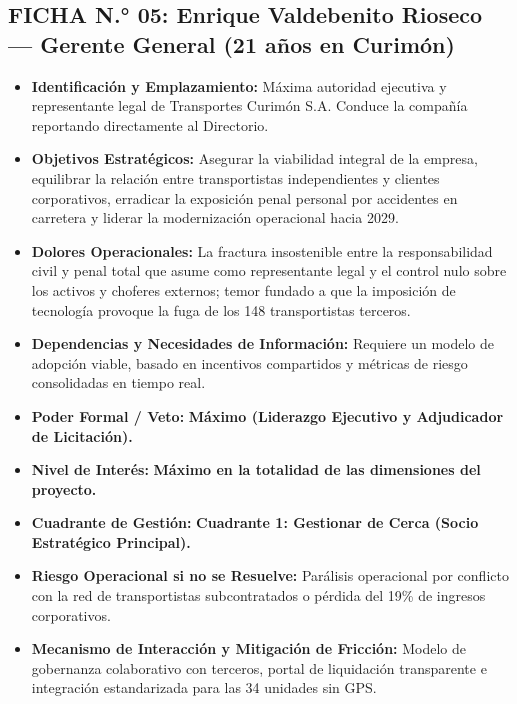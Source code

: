 \subsection*{FICHA N.° 05: Enrique Valdebenito Rioseco — Gerente General (21 años en Curimón)}
\begin{itemize}
\item \textbf{Identificación y Emplazamiento:} Máxima autoridad ejecutiva y representante legal de Transportes Curimón S.A. Conduce la compañía reportando directamente al Directorio.
\item \textbf{Objetivos Estratégicos:} Asegurar la viabilidad integral de la empresa, equilibrar la relación entre transportistas independientes y clientes corporativos, erradicar la exposición penal personal por accidentes en carretera y liderar la modernización operacional hacia 2029.
\item \textbf{Dolores Operacionales:} La fractura insostenible entre la responsabilidad civil y penal total que asume como representante legal y el control nulo sobre los activos y choferes externos; temor fundado a que la imposición de tecnología provoque la fuga de los 148 transportistas terceros.
\item \textbf{Dependencias y Necesidades de Información:} Requiere un modelo de adopción viable, basado en incentivos compartidos y métricas de riesgo consolidadas en tiempo real.
\item \textbf{Poder Formal / Veto:} \textbf{Máximo (Liderazgo Ejecutivo y Adjudicador de Licitación).}
\item \textbf{Nivel de Interés:} \textbf{Máximo en la totalidad de las dimensiones del proyecto.}
\item \textbf{Cuadrante de Gestión:} \textbf{Cuadrante 1: Gestionar de Cerca (Socio Estratégico Principal).}
\item \textbf{Riesgo Operacional si no se Resuelve:} Parálisis operacional por conflicto con la red de transportistas subcontratados o pérdida del 19\% de ingresos corporativos.
\item \textbf{Mecanismo de Interacción y Mitigación de Fricción:} Modelo de gobernanza colaborativo con terceros, portal de liquidación transparente e integración estandarizada para las 34 unidades sin GPS.
\end{itemize}
